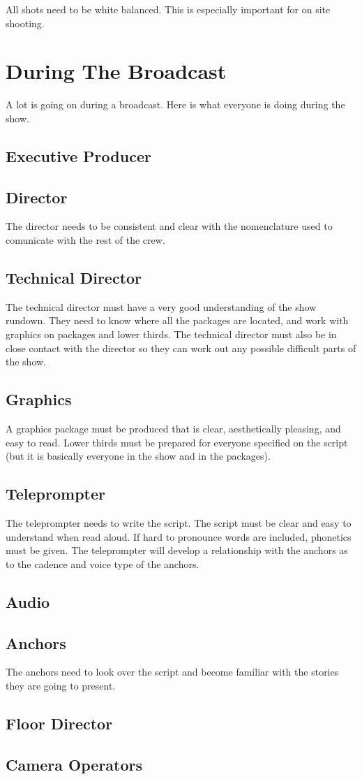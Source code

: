 \documentclass[letterpaper,10pt,oneside]{article}
\begin{document}
All shots need to be white balanced. This is especially important for on site shooting.




\section{During The Broadcast}
A lot is going on during a broadcast. Here is what everyone is doing during the show.
\subsection{Executive Producer}

\subsection{Director}
The director needs to be consistent and clear with the nomenclature used to comunicate with the rest of the crew.

\subsection{Technical Director}
The technical director must have a very good understanding of the show rundown. They need to know where all the packages are located, and work with graphics on packages and lower thirds. The technical director must also be in close contact with the director so they can work out any possible difficult parts of the show.

\subsection{Graphics}
A graphics package must be produced that is clear, aesthetically pleasing, and easy to read. Lower thirds must be prepared for everyone specified on the script (but it is basically everyone in the show and in the packages).

\subsection{Teleprompter}
The teleprompter needs to write the script. The script must be clear and easy to understand when read aloud. If hard to pronounce words are included, phonetics must be given. The teleprompter will develop a relationship with the anchors as to the cadence and voice type of the anchors.

\subsection{Audio}

\subsection{Anchors}
The anchors need to look over the script and become familiar with the stories they are going to present.

\subsection{Floor Director}

\subsection{Camera Operators}
\end{document}
